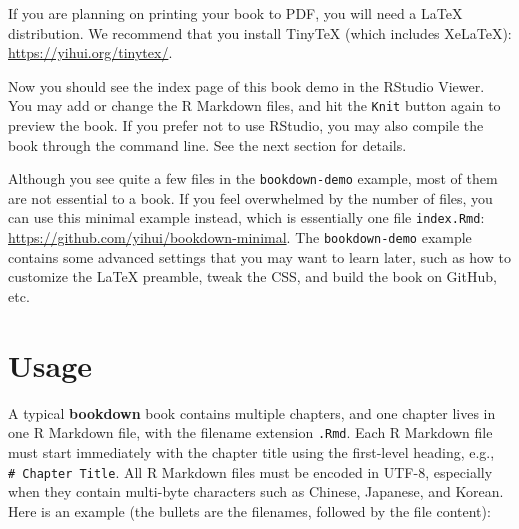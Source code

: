 \documentclass[
]{book}
\begin{document}
\begin{rmdnote}
If you are planning on printing your book to PDF, you will need a LaTeX distribution. We recommend that you install TinyTeX (which includes XeLaTeX): \url{https://yihui.org/tinytex/}.
\end{rmdnote}

Now you should see the index page of this book demo in the RStudio Viewer. You may add or change the R Markdown files, and hit the \texttt{Knit} button again to preview the book. If you prefer not to use RStudio, you may also compile the book through the command line. See the next section for details.

Although you see quite a few files in the \texttt{bookdown-demo} example, most of them are not essential to a book. If you feel overwhelmed by the number of files, you can use this minimal example instead, which is essentially one file \texttt{index.Rmd}: \url{https://github.com/yihui/bookdown-minimal}. The \texttt{bookdown-demo} example contains some advanced settings that you may want to learn later, such as how to customize the LaTeX preamble, tweak the CSS, and build the book on GitHub, etc.

\hypertarget{usage}{%
\section{Usage}\label{usage}}

A typical \textbf{bookdown} book contains multiple chapters, and one chapter lives in one R Markdown file, with the filename extension \texttt{.Rmd}. Each R Markdown file must start immediately with the chapter title using the first-level heading, e.g., \texttt{\#\ Chapter\ Title}. All R Markdown files must be encoded in UTF-8, especially when they contain multi-byte characters such as Chinese, Japanese, and Korean. Here is an example (the bullets are the filenames, followed by the file content):
\end{document}
